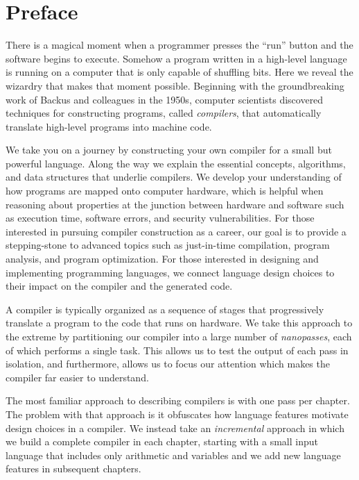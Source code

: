 \documentclass[7x10,nocrop]{TimesAPriori_MIT}%
\begin{document}

\tableofcontents



\chapter*{Preface}

There is a magical moment when a programmer presses the ``run'' button
and the software begins to execute. Somehow a program written in a
high-level language is running on a computer that is only capable of
shuffling bits. Here we reveal the wizardry that makes that moment
possible. Beginning with the groundbreaking work of Backus and
colleagues in the 1950s, computer scientists discovered techniques for
constructing programs, called \emph{compilers}, that automatically
translate high-level programs into machine code.

We take you on a journey by constructing your own compiler for a small
but powerful language. Along the way we explain the essential
concepts, algorithms, and data structures that underlie compilers. We
develop your understanding of how programs are mapped onto computer
hardware, which is helpful when reasoning about properties at the
junction between hardware and software such as execution time,
software errors, and security vulnerabilities.  For those interested
in pursuing compiler construction as a career, our goal is to provide a
stepping-stone to advanced topics such as just-in-time compilation,
program analysis, and program optimization.  For those interested in
designing and implementing programming languages, we connect
language design choices to their impact on the compiler and the generated
code.

A compiler is typically organized as a sequence of stages that
progressively translate a program to the code that runs on
hardware. We take this approach to the extreme by partitioning our
compiler into a large number of \emph{nanopasses}, each of which
performs a single task. This allows us to test the output of each pass
in isolation, and furthermore, allows us to focus our attention which
makes the compiler far easier to understand.

The most familiar approach to describing compilers is with one pass
per chapter.  The problem with that approach is it obfuscates how
language features motivate design choices in a compiler. We instead
take an \emph{incremental} approach in which we build a complete
compiler in each chapter, starting with a small input language that
includes only arithmetic and variables and we add new language
features in subsequent chapters.
\end{document}
